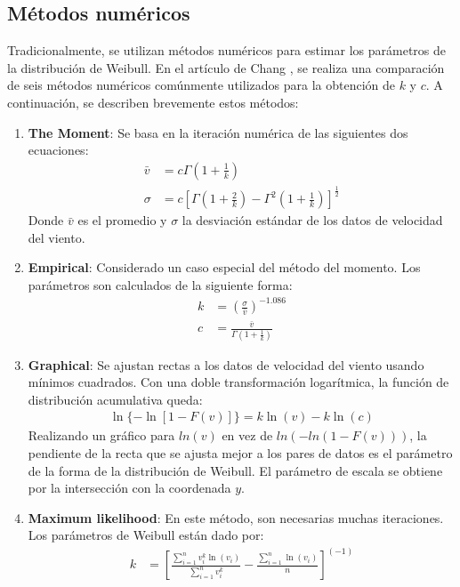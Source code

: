  \subsection{Métodos numéricos}  \label{subsec:Numeric_Methods}
 Tradicionalmente, se utilizan métodos numéricos para estimar los parámetros de la distribución de Weibull. En el artículo de Chang \cite{Chang10}, se realiza una comparación de seis métodos numéricos comúnmente utilizados para la obtención de $k$ y $c$. A continuación, se describen brevemente estos métodos:
 \begin{enumerate}
     \item \textbf{The Moment}: Se basa en la iteración numérica de las siguientes dos ecuaciones:
        \begin{align}
            \bar{v} &= c\Gamma(1 + \frac{1}{k})\\
            \sigma &= c[\Gamma(1 + \frac{2}{k}) - \Gamma^2(1 + \frac{1}{k})]^{\frac{1}{2}}
        \end{align}    
        Donde $\bar{v}$ es el promedio y $\sigma$ la desviación estándar de los datos de velocidad del viento.
    \item \textbf{Empirical}: Considerado un caso especial del método del momento. Los parámetros son calculados de la siguiente forma: 
        \begin{align}
            k &= (\frac{\sigma}{\bar{v}})^{-1.086}\\
            c &= \frac{\bar{v}}{\Gamma(1 + \frac{1}{k})}
        \end{align}    
    \item \textbf{Graphical}: Se ajustan rectas a los datos de velocidad del viento usando mínimos cuadrados. Con una doble transformación logarítmica, la función de distribución acumulativa queda:
        \begin{align}
            \ln\{-\ln[1- F(v)]\} = k\ln(v) - k\ln(c)
        \end{align}    
         Realizando un gráfico para $ln(v)$ en vez de $ln(-ln(1-F(v)))$, la pendiente de la recta que se ajusta mejor a los pares de datos es el parámetro de la forma de la distribución de Weibull. El parámetro de escala se obtiene por la intersección con la coordenada $y$.  
    \item \textbf{Maximum likelihood}: En este método, son necesarias muchas iteraciones. Los parámetros de Weibull están dado por:
        \begin{align}
            k &= [\frac{\sum_{i=1}^n v_i^k \ln(v_i)}{\sum_{i=1}^n v_i^k} - \frac{\sum_{i=1}^n \ln(v_i)}{n}]^{(-1)}\\

\end{align}
\end{enumerate}
